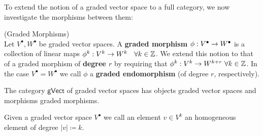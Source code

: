 To extend the notion of a graded vector space to a full category, we now investigate the morphisms between them:

\begin{definition} (Graded Morphisms)\\
 Let $V^\bullet, W^\bullet$ be graded vector spaces.  A \textbf{graded morphism} $\phi: V^\bullet \ra W^\bullet$ is  a collection of linear maps $\phi^k: V^k \ra W^k$ \ $\forall k \in \mathbb{Z}$. We extend this notion to that of a graded morphism of \textbf{degree $r$} by requiring that $\phi^k: V^k \ra W^{k+r}\ \forall k \in \ZZ$. In the case $V^\bullet = W^\bullet$ we call $\phi$ a \textbf{graded endomorphism} (of degree $r$, respectively).

 The category $\mathsf{gVect}$ of graded vector spaces has objects graded vector spaces and morphisms graded morphisms.
\end{definition}

Given a graded vector space $V^\bullet$ we call an element $v\in V^k$ an homogeneous element of degree $|v|\coloneqq k$.

